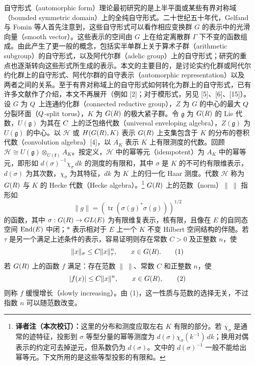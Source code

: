 自守形式（automorphic form）理论最初研究的是上半平面或某些有界对称域（bounded symmetric domain）上的全纯自守形式。二十世纪五十年代，Gelfand 与 Fomin 等人首先注意到，这些自守形式可以看作相应变换群 $G$ 的表示中的光滑向量（smooth vector）。这些表示的空间由 $G$ 上在给定离散群 $\Gamma$ 下不变的函数组成。由此产生了更一般的概念，包括实半单群上关于算术子群（arithmetic subgroup）的自守形式，以及阿代尔群（adelic group）上的自守形式；研究的重点也逐渐转向这些形式所生成的表示。本文的主要目的，是讨论实约化群或阿代尔约化群上的自守形式、阿代尔群的自守表示（automorphic representation）以及两者之间的关系。至于有界对称域上的自守形式如何转化为群上的自守形式，已有许多文献作了介绍，本文不再展开（例如 [2]；对于模形式，另见 [5]、[6]、[15]）。
设 $G$ 为 $Q$ 上连通约化群（connected reductive group），$Z$ 为 $G$ 的中心的最大 $Q$ 分裂环面（$Q$-split torus），$K$ 为 $G(R)$ 的极大紧子群。令 $\mathfrak g$ 为 $G(R)$ 的 Lie 代数，$U(\mathfrak g)$ 为其在 $C$ 上的泛包络代数（universal enveloping algebra），$Z(\mathfrak g)$ 为 $U(\mathfrak g)$ 的中心。以 $\mathcal H$ 或 $H(G(R),K)$ 表示 $G(R)$ 上支集包含于 $K$ 的分布的卷积代数（convolution algebra）[4]，以 $A_K$ 表示 $K$ 上有限测度的代数。回顾 $\mathcal H\cong U(\mathfrak g)\otimes_{U(\mathfrak k)}A_K$。按定义，$\mathcal H$ 中的幂等元（idempotent）为 $A_K$ 中的幂等元，即形如 $d(\sigma)^{-1}\chi_\sigma\,dk$ 的测度的有限和，其中 $\sigma$ 是 $K$ 的不可约有限维表示，$d(\sigma)$ 为其次数，$\chi_\sigma$ 为其特征，$dk$ 为 $K$ 上的归一化 Haar 测度。代数 $\mathcal H$ 称为 $G(R)$ 与 $K$ 的 Hecke 代数（Hecke algebra）。\footnote{\textbf{译者注（本次校订）：}这里的分布和测度应取左右 $K$ 有限的部分。若 $\chi_\sigma$ 是通常的迹特征，投影到 $\sigma$ 等型分量的幂等测度为 $d(\sigma)\chi_\sigma(k^{-1})\,dk$；换用对偶表示的约定可去掉逆元，但系数仍为 $d(\sigma)$。文中的 $d(\sigma)^{-1}$ 一般不能给出幂等元。下文所用的是这些等型投影的有限和。}
$G(R)$ 上的范数（norm）$\|\ \|$ 指形如
\[
\|g\|=(\operatorname{tr}(\sigma(g)^*\sigma(g)))^{1/2}
\]
的函数，其中 $\sigma:G(R)\to GL(E)$ 为有限维复表示，核有限，且像在 $E$ 的自同态空间 $\operatorname{End}(E)$ 中闭；$*$ 表示相对于 $E$ 上一个 $K$ 不变 Hilbert 空间结构的伴随。若 $\tau$ 是另一个满足上述条件的表示，容易证明则存在常数 $C>0$ 及正整数 $n$，使
\[
\|x\|_\sigma\leq C\|x\|_\tau^n,\qquad x\in G(R).\tag{1}
\]
若 $G(R)$ 上的函数 $f$ 满足：存在范数 $\|\ \|$、常数 $C$ 和正整数 $n$，使
\[
|f(x)|\leq C\|x\|^n,\qquad x\in G(R),\tag{2}
\]
则称 $f$ 缓慢增长（slowly increasing）。由 (1)，这一性质与范数的选择无关，不过指数 $n$ 可以随范数改变。
